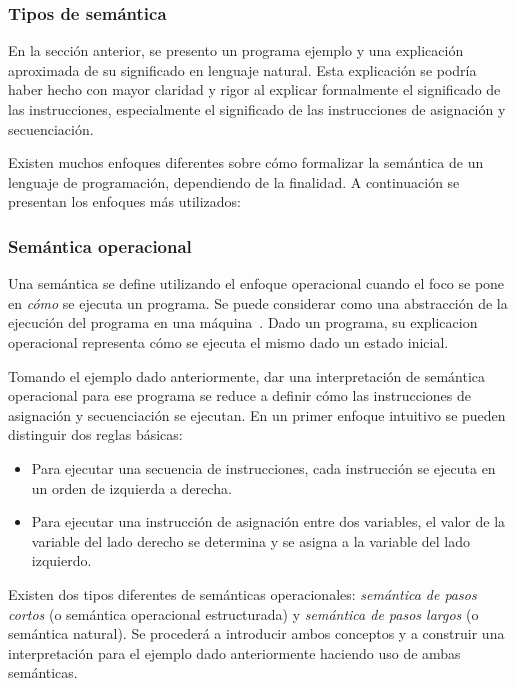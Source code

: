 \subsubsection*{Tipos de semántica}

En la sección anterior, se presento un programa ejemplo y una explicación aproximada de su significado en lenguaje natural.
Esta explicación se podría haber hecho con mayor claridad y rigor al explicar formalmente el significado de las instrucciones, especialmente el significado de las instrucciones de asignación y secuenciación.

Existen muchos enfoques diferentes sobre cómo formalizar la semántica de un lenguaje de programación, dependiendo de la finalidad.
A continuación se presentan los enfoques más utilizados:


\subsubsection*{Semántica operacional}

Una semántica se define utilizando el enfoque operacional cuando el foco se pone en \textit{cómo} se ejecuta un programa.
Se puede considerar como una abstracción de la ejecución del programa en una máquina~\cite{nielson}.
Dado un programa, su explicacion operacional representa cómo se ejecuta el mismo dado un estado inicial.

Tomando el ejemplo dado anteriormente, dar una interpretación de semántica operacional para ese programa se reduce a definir cómo las instrucciones de asignación y secuenciación se ejecutan.
En un primer enfoque intuitivo se pueden distinguir dos reglas básicas:

\begin{itemize}
\item{Para ejecutar una secuencia de instrucciones, cada instrucción se ejecuta en un orden de izquierda a derecha.}
\item{Para ejecutar una instrucción de asignación entre dos variables, el valor de la variable del lado derecho se determina y se asigna a la variable del lado izquierdo.}
\end{itemize}

Existen dos tipos diferentes de semánticas operacionales: \textit{semántica de pasos cortos} (o semántica operacional estructurada) y \textit{semántica de pasos largos} (o semántica natural).
Se procederá a introducir ambos conceptos y a construir una interpretación para el ejemplo dado anteriormente haciendo uso de ambas semánticas.



